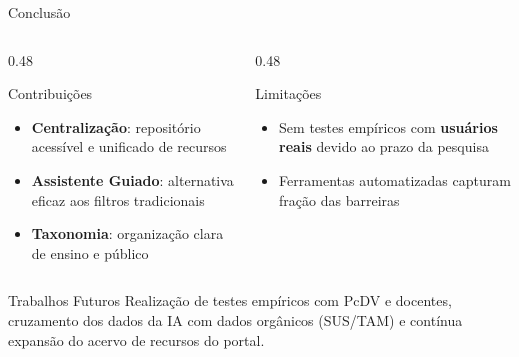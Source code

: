 \documentclass[aspectratio=169]{beamer}
\begin{document}
\begin{frame}{Conclusão}
    \begin{columns}[T]
        \begin{column}{0.48\textwidth}
            \begin{block}{Contribuições}
                \begin{itemize}\small
                    \item \textbf{Centralização}: repositório acessível e unificado de recursos
                    \item \textbf{Assistente Guiado}: alternativa eficaz aos filtros tradicionais
                    \item \textbf{Taxonomia}: organização clara de ensino e público
                \end{itemize}
            \end{block}
        \end{column}
        \begin{column}{0.48\textwidth}
            \begin{alertblock}{Limitações}
                \begin{itemize}\small
                    \item Sem testes empíricos com \textbf{usuários reais} devido ao prazo da pesquisa
                    \item Ferramentas automatizadas capturam fração das barreiras
                \end{itemize}
            \end{alertblock}
        \end{column}
    \end{columns}

    \vspace{0.15cm}

    \begin{exampleblock}{Trabalhos Futuros}
        Realização de testes empíricos com PcDV e docentes, cruzamento dos dados da IA com dados orgânicos (SUS/TAM) e contínua expansão do acervo de recursos do portal.
    \end{exampleblock}

\end{frame}
\end{document}
